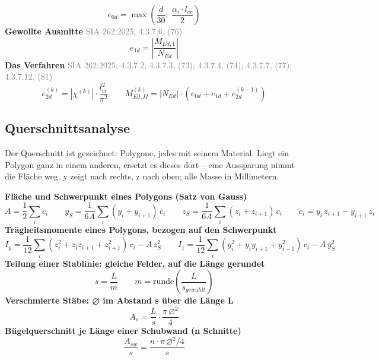 \documentclass[11pt,a4paper]{article}
\newcommand{\normref}[1]{{\small\textcolor{gray}{#1}}}
\begin{document}
\begin{equation*}
e_{0d} = \max\left(\frac{d}{30};\ \frac{\alpha_i \cdot l_{cr}}{2}\right)
\end{equation*}
\noindent\textbf{Gewollte Ausmitte} \hfill \normref{SIA 262:2025, 4.3.7.6, (76)}
\begin{equation*}
e_{1d} = \left|\frac{M_{Ed,1}}{N_{Ed}}\right|
\end{equation*}
\noindent\textbf{Das Verfahren} \hfill \normref{SIA 262:2025, 4.3.7.2; 4.3.7.3, (73); 4.3.7.4, (74); 4.3.7.7, (77); 4.3.7.12, (81)}
\begin{equation*}
e_{2d}^{(k)} = \left|\chi^{(k)}\right| \cdot \frac{l_{cr}^{2}}{\pi^{2}} \qquad M_{Ed,II}^{(k)} = \left|N_{Ed}\right| \cdot \left(e_{0d} + e_{1d} + e_{2d}^{(k-1)}\right)
\end{equation*}
\subsection{Querschnittsanalyse}
Der Querschnitt ist gezeichnet: Polygone, jedes mit seinem Material. Liegt ein Polygon ganz in einem anderen, ersetzt es dieses dort -- eine Aussparung nimmt die Fläche weg. y zeigt nach rechts, z nach oben; alle Masse in Millimetern.

\noindent\textbf{Fläche und Schwerpunkt eines Polygons (Satz von Gauss)}
\begin{equation*}
A = \frac{1}{2} \sum_i c_i \qquad y_S = \frac{1}{6A} \sum_i (y_i + y_{i+1})\, c_i \qquad z_S = \frac{1}{6A} \sum_i (z_i + z_{i+1})\, c_i \qquad c_i = y_i\, z_{i+1} - y_{i+1}\, z_i
\end{equation*}
\noindent\textbf{Trägheitsmomente eines Polygons, bezogen auf den Schwerpunkt}
\begin{equation*}
I_y = \frac{1}{12} \sum_i (z_i^2 + z_i z_{i+1} + z_{i+1}^2)\, c_i - A\, z_S^2\qquad I_z = \frac{1}{12} \sum_i (y_i^2 + y_i y_{i+1} + y_{i+1}^2)\, c_i - A\, y_S^2
\end{equation*}
\noindent\textbf{Teilung einer Stablinie: gleiche Felder, auf die Länge gerundet}
\begin{equation*}
s = \frac{L}{m} \qquad m = \mathrm{runde}\left(\frac{L}{s_{gewählt}}\right)
\end{equation*}
\noindent\textbf{Verschmierte Stäbe: ⌀ im Abstand s über die Länge L}
\begin{equation*}
A_s = \frac{L}{s} \cdot \frac{\pi\, \varnothing^2}{4}
\end{equation*}
\noindent\textbf{Bügelquerschnitt je Länge einer Schubwand (n Schnitte)}
\begin{equation*}
\frac{A_{sw}}{s} = \frac{n \cdot \pi\, \varnothing^2 / 4}{s}
\end{equation*}
\end{document}
